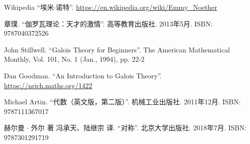 \documentclass[b5paper]{ctexart}
\begin{document}
\begin{thebibliography}{99}
Wikipedia ``埃米$\cdot$诺特''. \url{https://en.wikipedia.org/wiki/Emmy_Noether}

章璞. ``伽罗瓦理论：天才的激情''. 高等教育出版社. 2013年5月. ISBN: 9787040372526

John Stillwell. ``Galois Theory for Beginners''. The American Mathematical Monthly, Vol. 101, No. 1 (Jan., 1994), pp. 22-2

Dan Goodman. ``An Introduction to Galois Theory''. \url{https://nrich.maths.org/1422}

Michael Artin. ``代数（英文版，第二版）''. 机械工业出版社. 2011年12月. ISBN: 9787111367017

赫尔曼 $\cdot$ 外尔 著 冯承天、陆继宗 译. ``对称''. 北京大学出版社. 2018年7月. ISBN: 9787301291719

\end{thebibliography}

\expandafter\enddocument

\fi
\end{document}

